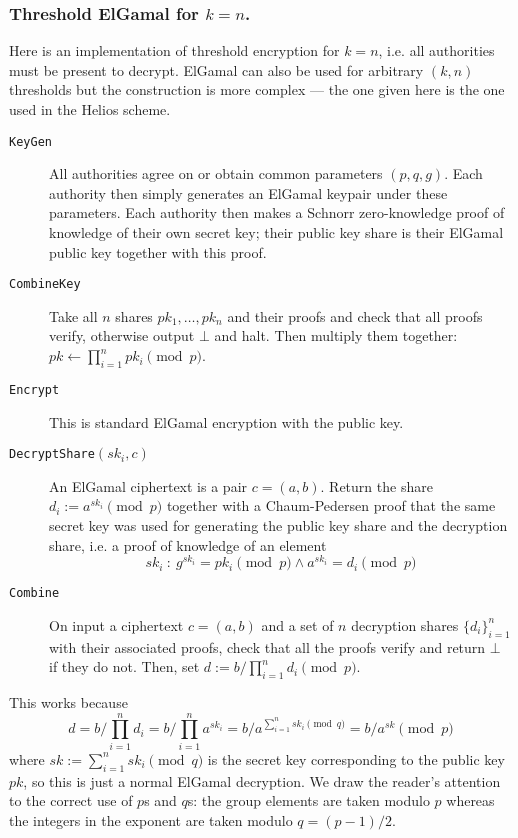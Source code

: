 \documentclass{llncs}
\newcommand{\alg}[1]{\textup{\texttt{#1}}}
\begin{document}
\subsubsection{Threshold ElGamal for $k = n$.}
Here is an implementation of threshold encryption for $k = n$, i.e. all
authorities must be present to decrypt. ElGamal can also be used for arbitrary
$(k, n)$ thresholds but the construction is more complex --- the one given here
is the one used in the Helios scheme.

\begin{description}
\item[\alg{KeyGen}]
All authorities agree on or obtain common parameters $(p, q, g)$. Each authority
then simply generates an ElGamal keypair under these parameters. Each authority
then makes a Schnorr zero-knowledge proof of knowledge of their own secret key;
their public key share is their ElGamal public key together with this proof.

\item[\alg{CombineKey}]
Take all $n$ shares $pk_1, \ldots, pk_n$ and their proofs and check that all
proofs verify, otherwise output $\bot$ and halt. Then multiply them together:
$pk \gets \prod_{i=1}^n pk_i \pmod{p}$.

\item[\alg{Encrypt}] This is standard ElGamal encryption with the public key.

\item[\alg{DecryptShare}$(sk_i, c)$] An ElGamal ciphertext is a pair $c = (a, b)$. Return the share $d_i := a^{sk_i} \pmod{p}$ together with a Chaum-Pedersen proof that
the same secret key was used for generating the public key share and the decryption share, i.e. a proof of knowledge of an element
\[
sk_i\ :\ g^{sk_i} = pk_i \pmod{p} \wedge a^{sk_i} = d_i \pmod{p}
\]

\item[\alg{Combine}]
On input a ciphertext $c = (a, b)$ and a set of $n$ decryption shares
$\{d_i\}_{i=1}^n$ with their associated proofs, check that all the proofs verify
and return $\bot$ if they do not. Then, set $d := b / \prod_{i=1}^n d_i
\pmod{p}$.
\end{description}

This works because
\[
d = b / \prod_{i=1}^n d_i = b / \prod_{i=1}^n a^{sk_i} = b / a^{\sum_{i=1}^n sk_i \pmod{q}} = b / a^{sk} \pmod{p}
\]
where $sk := \sum_{i=1}^n sk_i \pmod{q}$ is the secret key corresponding to the
public key $pk$, so this is just a normal ElGamal decryption.
We draw the reader's attention to the correct use of $p$s and $q$s: the group
elements are taken modulo $p$ whereas the integers in the exponent are taken
modulo $q = (p-1)/2$.
\end{document}
